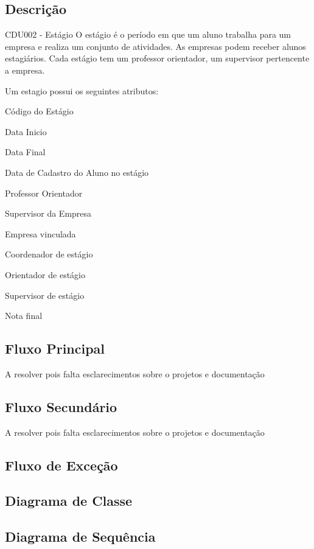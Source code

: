 \subsection{Descrição}
CDU002 - Estágio
    O estágio é o período em que um aluno trabalha para um empresa e realiza um
conjunto de atividades. As empresas podem receber alunos estagiários.
Cada estágio tem um professor orientador, um supervisor pertencente a empresa.

Um estagio possui os seguintes atributos:


Código do Estágio

Data Inicio

Data Final

Data de Cadastro do Aluno no estágio

Professor Orientador

Supervisor da Empresa

Empresa vinculada

Coordenador de estágio

Orientador de estágio

Supervisor de estágio

Nota final






\subsection{Fluxo Principal}


A resolver pois falta esclarecimentos sobre o projetos e documentação

\subsection{Fluxo Secundário}

A resolver pois falta esclarecimentos sobre o projetos e documentação

\subsection{Fluxo de Exceção}

\subsection{Diagrama de Classe}

\subsection{Diagrama de Sequência}